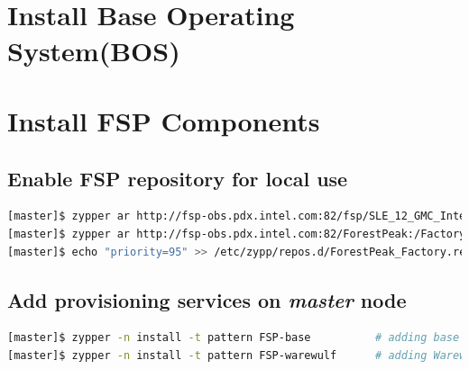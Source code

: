 \documentclass[letterpaper]{article}
\begin{document}
 \\

 \\




\section{Install Base Operating System(BOS)}



\section{Install FSP Components} \label{sec:basic_install}


\subsection{Enable FSP repository for local use}


\begin{lstlisting}[language=bash]
[master]$ zypper ar http://fsp-obs.pdx.intel.com:82/fsp/SLE_12_GMC_Intel/fsp.repo
[master]$ zypper ar http://fsp-obs.pdx.intel.com:82/ForestPeak:/Factory/SLE_12_Intel/ForestPeak:Factory.repo
[master]$ echo "priority=95" >> /etc/zypp/repos.d/ForestPeak_Factory.repo
\end{lstlisting}


\subsection{Add provisioning services on {\em master} node}


\begin{lstlisting}[language=bash,keywords={}]
[master]$ zypper -n install -t pattern FSP-base          # adding base FSP packages
[master]$ zypper -n install -t pattern FSP-warewulf      # adding Warewulf support
\end{lstlisting}
\end{document}
